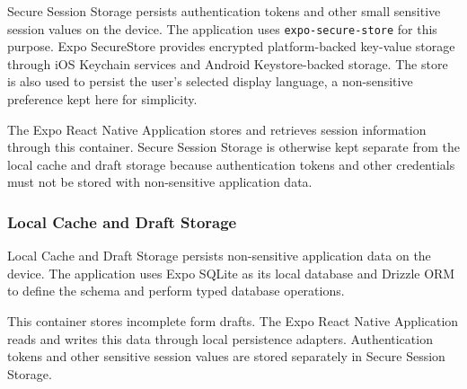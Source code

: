 Secure Session Storage persists authentication tokens and other small sensitive session values on the device.
The application uses \texttt{expo-secure-store} for this purpose.
Expo SecureStore provides encrypted platform-backed key-value storage through iOS Keychain services and Android Keystore-backed storage.
The store is also used to persist the user's selected display language, a non-sensitive preference kept here for simplicity.

The Expo React Native Application stores and retrieves session information through this container.
Secure Session Storage is otherwise kept separate from the local cache and draft storage because authentication tokens and other credentials must not be stored with non-sensitive application data.

\subsubsection{Local Cache and Draft Storage}
\label{sec:c2-local-storage}

Local Cache and Draft Storage persists non-sensitive application data on the device.
The application uses Expo SQLite as its local database and Drizzle ORM to define the schema and perform typed database operations.

This container stores incomplete form drafts.
The Expo React Native Application reads and writes this data through local persistence adapters.
Authentication tokens and other sensitive session values are stored separately in Secure Session Storage.
